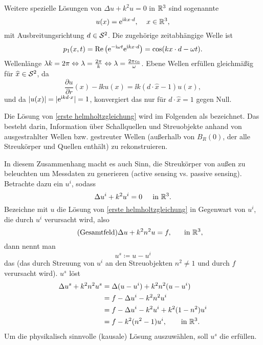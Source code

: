 \begin{bsp}
	Weitere spezielle Lösungen von \(\Delta u+k^2u=0\) in \(\mathbb{R}^3\) sind sogenannte 
	\begin{equation}
		\label{ebene wellen}
		u(x)=\mathrm{e}^{\mathrm{i} kx\cdot d},\;\;\;\;x\in\mathbb{R}^3,
	\end{equation}
	mit Ausbreitungsrichtung \(d\in\mathcal{S}^2\). Die zugehörige zeitabhängige Welle ist
	\begin{equation*}
		p_1(x,t)=\operatorname{Re}\big(\mathrm{e}^{-\mathrm{i}\omega t}\mathrm{e}^{\mathrm{i} kx\cdot d}\big)=\cos(kx\cdot d-\omega t).
	\end{equation*}
	Wellenlänge \(\lambda k=2\pi\Leftrightarrow\lambda=\frac{2\pi}{k}\Leftrightarrow\lambda=\frac{2\pi c_0}{\omega}\). Ebene Wellen erfüllen \SAB  {} gleichmäßig für \(\widehat{x}\in\mathcal{S}^2\), da
	\begin{equation*}
		\frac{\partial u}{\partial r}(x)-\ii ku(x)=\ii k(d\cdot \widehat{x}-1)u(x),
	\end{equation*}
	und da \(|u(x)|=|\mathrm{e}^{\mathrm{i} kd\cdot x}|=1\), konvergiert das nur für \(d\cdot\widehat{x}=1\) gegen Null.\vspace{2mm}
	
	Die Lösung von \eqref{erste helmholtzgleichung} wird im Folgenden als  bezeichnet. Das  besteht darin, Information über Schallquellen und Streuobjekte anhand von ausgestrahlter Wellen bzw. gestreuter Wellen (außerhalb von \(B_R(0)\), der alle Streukörper und Quellen enthält) zu rekonstruieren.\vspace{2mm}
	
	In diesem Zusammenhang macht es auch Sinn, die Streukörper von außen zu \glqq{}beleuchten\grqq{} um Messdaten zu generieren (active sensing vs. passive sensing). Betrachte dazu ein  \(u^i\), sodass
	\begin{equation}
		\label{primärfeld ui in bsp}
		\Delta u^i+k^2u^i=0\;\;\;\;\text{ in }\mathbb{R}^3.
	\end{equation}
	Bezeichne mit \(u\) die Lösung von \eqref{erste helmholtzgleichung} in Gegenwart von \(u^i\), die durch \(u^i\) verursacht wird, also
	\begin{equation*}
		\tag{Gesamtfeld}
		\Delta u+k^2n^2u=f,\;\;\;\;\;\text{ in }\mathbb{R}^3,
	\end{equation*}
	dann nennt man
	\begin{equation*}
		u^s\coloneqq u-u^i
	\end{equation*}
	das  (das durch Streuung von \(u^i\) an den Streuobjekten \(n^2\neq1\) und durch \(f\) verursacht wird). \(u^s\) löst
	\begin{equation*}
		\begin{aligned}
			\Delta u^s+k^2n^2u^s&=\Delta(u-u^i)+k^2n^2(u-u^i)\\
			&=f-\Delta u^i-k^2n^2u^i\\
			&=f-\Delta u^i-k^2u^i+k^2(1-n^2)u^i\\
			&=f-k^2(n^2-1)u^i,\;\;\;\;\;\;\text{ in }\mathbb{R}^3.
		\end{aligned}
	\end{equation*}
	Um die physikalisch sinnvolle (kausale) Lösung auszuwählen, soll \(u^s\) die \SAB  erfüllen.
\end{bsp}



